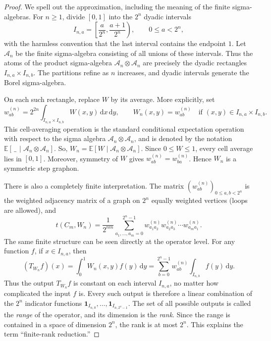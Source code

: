 \documentclass[11pt]{article}
\newcommand{\one}{\mathbf 1}
\newcommand{\dd}{\,\mathrm d}
\newcommand{\E}{\mathbb E}
\begin{document}
\begin{proof}
We spell out the approximation, including the meaning of the finite
sigma-algebras.  For \(n\ge1\), divide \([0,1]\) into the \(2^n\) dyadic
intervals
\[
 I_{n,a}=\left[\frac{a}{2^n},\frac{a+1}{2^n}\right),
 \qquad 0\le a<2^n,
\]
with the harmless convention that the last interval contains the endpoint
\(1\).  Let \(\mathcal A_n\) be the finite sigma-algebra consisting of all
unions of these intervals.  Thus the atoms of the product sigma-algebra
\(\mathcal A_n\otimes\mathcal A_n\) are precisely the dyadic rectangles
\(I_{n,a}\times I_{n,b}\).  The partitions refine as \(n\) increases, and
dyadic intervals generate the Borel sigma-algebra.

On each such rectangle, replace \(W\) by its average.  More explicitly, set
\begin{equation}\label{eq:dyadic-step-approximation}
 w^{(n)}_{ab}
   =2^{2n}\int_{I_{n,a}\times I_{n,b}}W(x,y)\dd x\dd y,
 \qquad
 W_n(x,y)=w^{(n)}_{ab}
 \quad\text{if }(x,y)\in I_{n,a}\times I_{n,b}.
\end{equation}
This cell-averaging operation is the standard conditional 
expectation operation with respect to the sigma algebra
$\mathcal A_n\otimes\mathcal A_n$, and is 
denoted by the notation
\(\E[\,\_\, \mid\mathcal A_n\otimes\mathcal A_n]\). So,
\(W_n = \E[W\mid\mathcal A_n\otimes\mathcal A_n] \). Since \(0\le W\le1\),
every cell average lies in \([0,1]\).  Moreover, symmetry of \(W\) gives
\(w^{(n)}_{ab}=w^{(n)}_{ba}\).  Hence \(W_n\) is a symmetric step graphon.

There is also a completely finite interpretation.  The matrix
\((w^{(n)}_{ab})_{0\le a,b<2^n}\) is the weighted adjacency matrix of a graph
on \(2^n\) equally weighted vertices (loops are allowed), and
\[
 t(C_m,W_n)
 =\frac{1}{2^{nm}}
   \sum_{a_1,\ldots,a_m=0}^{2^n-1}
   w^{(n)}_{a_1a_2}w^{(n)}_{a_2a_3}\cdots
   w^{(n)}_{a_ma_1}.
\]
The same finite structure can be seen directly at the operator level.  For
any function \(f\), if \(x\in I_{n,a}\), then
\[
 (T_{W_n}f)(x)
 =\int_0^1W_n(x,y)f(y)\dd y
 =\sum_{b=0}^{2^n-1}w^{(n)}_{ab}
       \int_{I_{n,b}}f(y)\dd y.
\]
Thus the output \(T_{W_n}f\) is constant on each interval \(I_{n,a}\), no
matter how complicated the input \(f\) is.  Every such output is therefore a
linear combination of the \(2^n\) indicator functions
\(\one_{I_{n,0}},\ldots,\one_{I_{n,2^n-1}}\).  The set of all possible
outputs is called the \emph{range} of the operator, and its dimension is the
\emph{rank}.  Since the range is contained in a space of dimension \(2^n\),
the rank is at most \(2^n\).  This explains the term ``finite-rank
reduction.''


\end{proof}
\end{document}
